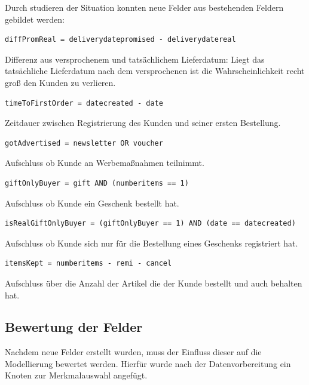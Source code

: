 \documentclass[a4paper,12pt]{article}
\begin{document}
Durch studieren der Situation konnten neue Felder aus bestehenden Feldern gebildet werden:  
\begin{framed}
\begin{verbatim}
diffPromReal = deliverydatepromised - deliverydatereal
\end{verbatim}
\end{framed}
Differenz aus versprochenem und tatsächlichem Lieferdatum: Liegt das tatsächliche Lieferdatum nach dem versprochenen ist die Wahrscheinlichkeit recht groß den Kunden zu verlieren. 
\begin{framed}
\begin{verbatim}
timeToFirstOrder = datecreated - date
\end{verbatim}
\end{framed}
Zeitdauer zwischen Registrierung des Kunden und seiner ersten Bestellung.
\begin{framed}
\begin{verbatim}
gotAdvertised = newsletter OR voucher
\end{verbatim}
\end{framed}
Aufschluss ob Kunde an Werbemaßnahmen teilnimmt.
\begin{framed}
\begin{verbatim}
giftOnlyBuyer = gift AND (numberitems == 1) 
\end{verbatim}
\end{framed}
Aufschluss ob Kunde ein Geschenk bestellt hat.
\begin{framed}
\begin{verbatim}
isRealGiftOnlyBuyer = (giftOnlyBuyer == 1) AND (date == datecreated)
\end{verbatim}
\end{framed}
Aufschluss ob Kunde sich nur für die Bestellung eines Geschenks registriert hat.
\begin{framed}
\begin{verbatim}
itemsKept = numberitems - remi - cancel 
\end{verbatim}
\end{framed}
Aufschluss  über die Anzahl der Artikel die der Kunde bestellt und auch behalten hat.



\subsection{Bewertung der Felder}

Nachdem neue Felder erstellt wurden, muss der Einfluss dieser auf die Modellierung bewertet werden.
Hierfür wurde nach der Datenvorbereitung  ein Knoten zur Merkmalauswahl angefügt.
\end{document}
